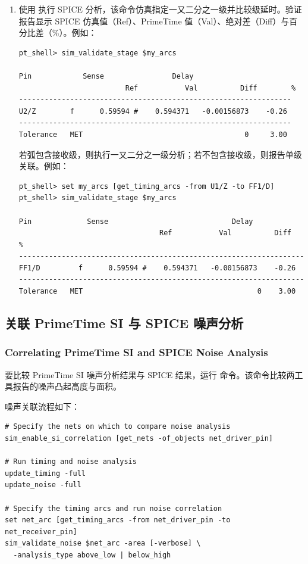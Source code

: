 \begin{enumerate}
  \item 使用  执行 SPICE 分析，该命令仿真指定一又二分之一级并比较级延时。验证报告显示 SPICE 仿真值（Ref）、PrimeTime 值（Val）、绝对差（Diff）与百分比差（\%）。例如：
\begin{lstlisting}
pt_shell> sim_validate_stage $my_arcs

Pin            Sense                Delay
                         Ref           Val          Diff        %
----------------------------------------------------------------
U2/Z        f      0.59594 #    0.594371   -0.00156873    -0.26
----------------------------------------------------------------
Tolerance   MET                                      0     3.00
\end{lstlisting}

        若弧包含接收级，则执行一又二分之一级分析；若不包含接收级，则报告单级关联。例如：
\begin{lstlisting}
pt_shell> set my_arcs [get_timing_arcs -from U1/Z -to FF1/D]
pt_shell> sim_validate_stage $my_arcs

Pin             Sense                             Delay
                                 Ref           Val          Diff        %
-------------------------------------------------------------------
FF1/D         f      0.59594 #    0.594371   -0.00156873    -0.26
-------------------------------------------------------------------
Tolerance   MET                                         0    3.00
\end{lstlisting}
\end{enumerate}

\subsection{关联 PrimeTime SI 与 SPICE 噪声分析}
\subsubsection*{Correlating PrimeTime SI and SPICE Noise Analysis}

要比较 PrimeTime SI 噪声分析结果与 SPICE 结果，运行  命令。该命令比较两工具报告的噪声凸起高度与面积。

噪声关联流程如下：
\begin{lstlisting}
# Specify the nets on which to compare noise analysis
sim_enable_si_correlation [get_nets -of_objects net_driver_pin]

# Run timing and noise analysis
update_timing -full
update_noise -full

# Specify the timing arcs and run noise correlation
set net_arc [get_timing_arcs -from net_driver_pin -to net_receiver_pin]
sim_validate_noise $net_arc -area [-verbose] \
  -analysis_type above_low | below_high
\end{lstlisting}


